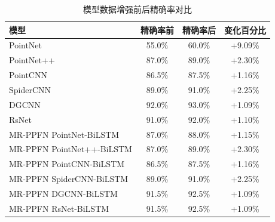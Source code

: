 \begin{table}[htbp]
    \begin{subtable}{\linewidth}
        \centering
        \caption{模型数据增强前后精确率对比}
        \begin{tabular}{lccc}
            \toprule
            \textbf{模型} & \textbf{精确率前} & \textbf{精确率后} & \textbf{变化百分比} \\
            \midrule
            PointNet & 55.0\% & 60.0\% & +9.09\% \\
            PointNet++ & 87.0\% & 89.0\% & +2.30\% \\
            PointCNN & 86.5\% & 87.5\% & +1.16\% \\
            SpiderCNN & 89.0\% & 91.0\% & +2.25\% \\
            DGCNN & 92.0\% & 93.0\% & +1.09\% \\
            RsNet & 91.0\% & 92.0\% & +1.10\% \\
            MR-PPFN PointNet-BiLSTM & 87.0\% & 88.0\% & +1.15\% \\
            MR-PPFN PointNet++-BiLSTM & 87.0\% & 89.0\% & +2.30\% \\
            MR-PPFN PointCNN-BiLSTM & 86.5\% & 87.5\% & +1.16\% \\
            MR-PPFN SpiderCNN-BiLSTM & 89.0\% & 91.0\% & +2.25\% \\
            MR-PPFN DGCNN-BiLSTM & 91.5\% & 92.5\% & +1.09\% \\
            MR-PPFN RsNet-BiLSTM & 91.5\% & 92.5\% & +1.09\% \\
            \bottomrule
        \end{tabular}
        \label{tab:precision-comparison}
    \end{subtable}
\end{table}

